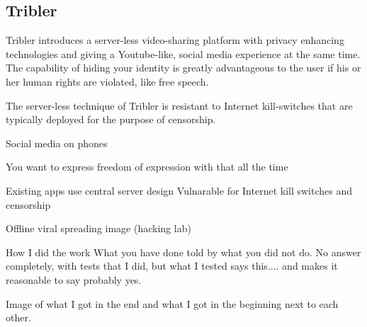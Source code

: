 


\subsection{Tribler} %

Tribler introduces a server-less video-sharing platform with privacy enhancing technologies and giving a Youtube-like, social media experience at the same time.
The capability of hiding your identity is greatly advantageous to the user if his or her human rights are violated, like free speech.

The server-less technique of Tribler is resistant to Internet kill-switches that are typically deployed for the purpose of censorship.




















Social media on phones

You want to express freedom of expression with that all the time %



Existing apps use central server design
Vulnarable for Internet kill switches and censorship

Offline viral spreading image (hacking lab)


How I did the work
What you have done told by what you did not do.
No answer completely, with tests that I did, but what I tested says this.... and makes it reasonable to say probably yes.


Image of what I got in the end and what I got in the beginning next to each other.


